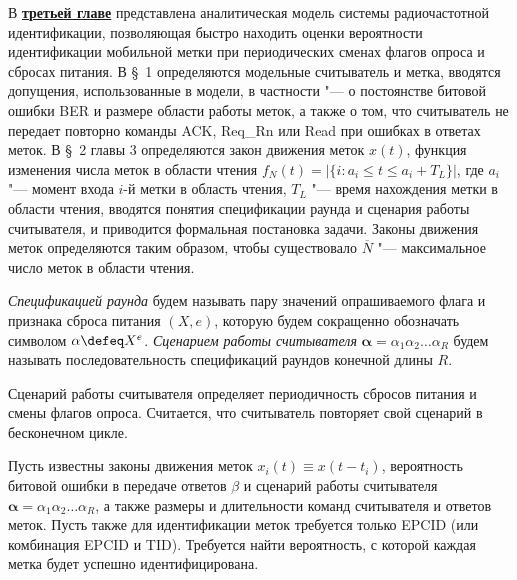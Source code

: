 В \underline{\textbf{третьей главе}} представлена аналитическая модель системы радиочастотной идентификации, позволяющая быстро находить оценки вероятности идентификации мобильной метки при периодических сменах флагов опроса и сбросах питания. В \S~1 определяются модельные считыватель и метка, вводятся допущения, использованные в модели, в частности "--- о постоянстве битовой ошибки BER и размере области работы меток, а также о том, что считыватель не передает повторно команды ACK, Req\_Rn или Read при ошибках в ответах меток. В \S~2 главы 3 определяются закон движения меток $x(t)$, функция изменения числа меток в области чтения $f_N(t) = | \{ i: a_i \leqslant t \leqslant a_i + T_L \} |$, где $a_i$ "--- момент входа $i$-й метки в область чтения, $T_L$ "--- время нахождения метки в области чтения, вводятся понятия спецификации раунда и сценария работы считывателя, и приводится формальная постановка задачи. Законы движения меток определяются таким образом, чтобы существовало $\overline{N}$ "--- максимальное число меток в области чтения.

\begin{defn}
\textit{Спецификацией раунда} будем называть пару значений опрашиваемого флага и признака сброса питания $(X, e)$, которую будем сокращенно обозначать символом $\alpha \defeq X^{e}$. \textit{Сценарием работы считывателя} $\bm{\alpha} = \alpha_1 \alpha_2 \dots \alpha_R$ будем называть последовательность спецификаций раундов конечной длины $R$.
\end{defn}

Сценарий работы считывателя определяет периодичность сбросов питания и смены флагов опроса. Считается, что считыватель повторяет свой сценарий в бесконечном цикле.

\begin{probl}\label{probl:analytic_problem}
  Пусть известны законы движения меток $x_i(t) \equiv x(t - t_i)$, вероятность битовой ошибки в передаче ответов $\beta$ и сценарий работы считывателя $\bm{\alpha} = \alpha_1 \alpha_2 \dots \alpha_R$, а также размеры и длительности команд считывателя и ответов меток. Пусть также для идентификации меток требуется только EPCID (или комбинация EPCID и TID). Требуется найти вероятность, с которой каждая метка будет успешно идентифицирована.
\end{probl}

